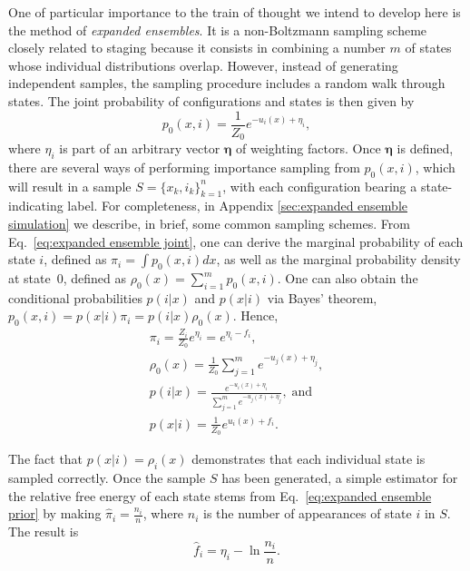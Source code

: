 \documentclass[aip,jcp,reprint,amsmath,amssymb]{revtex4-1}
\newcommand{\vt}[1]{\boldsymbol{\mathbf{#1}}}           %
\begin{document}
One of particular importance to the train of thought we intend to develop here is the method of \textit{expanded ensembles}.\cite{Lyubartsev_1992} It is a non-Boltzmann sampling scheme closely related to staging because it consists in combining a number $m$ of states whose individual distributions overlap. However, instead of generating independent samples, the sampling procedure includes a random walk through states. The joint probability of configurations and states is then given by\cite{Nymeyer_2010}
\begin{equation}
\label{eq:expanded ensemble joint}
p_0(x, i) = \frac{1}{Z_0} e^{-u_i(x) + \eta_i},
\end{equation}
where $\eta_i$ is part of an arbitrary vector $\vt \eta$ of weighting factors. Once $\vt \eta$ is defined, there are several ways of performing importance sampling from $p_0(x,i)$, which will result in a sample $S = \{x_k,i_k\}_{k=1}^n$, with each configuration bearing a state-indicating label. For completeness, in Appendix \ref{sec:expanded ensemble simulation} we describe, in brief, some common sampling schemes. From Eq.~\eqref{eq:expanded ensemble joint}, one can derive the marginal probability of each state $i$, defined as $\pi_i = \int p_0(x,i)dx$, as well as the marginal probability density at state~$0$, defined as $\rho_0(x) = \sum_{i=1}^m p_0(x,i)$. One can also obtain the conditional probabilities $p(i|x)$ and $p(x|i)$ via Bayes' theorem, $p_0(x,i) = p(x|i) \pi_i = p(i|x) \rho_0(x)$. Hence,
\begin{subequations}
\label{eq:expanded ensemble probabilities}
\begin{gather}
\pi_i = \frac{Z_i}{Z_0} e^{\eta_i} = e^{\eta_i - f_i}, \label{eq:expanded ensemble prior} \\
\rho_0(x) = \frac{1}{Z_0} \sum_{j=1}^m e^{-u_j(x) + \eta_j}, \label{eq:expanded ensemble evidence} \\
p(i|x) = \frac{e^{-u_i(x) + \eta_i}}{\sum_{j=1}^m e^{-u_j(x) + \eta_j}}, \; \text{and} \label{eq:expanded ensemble posterior} \\
p(x|i) = \frac{1}{Z_0} e^{u_i(x) + f_i}. \label{eq:expanded ensemble likelihood}
\end{gather}
\end{subequations}

The fact that $p(x|i) = \rho_i(x)$ demonstrates that each individual state is sampled correctly. Once the sample $S$ has been generated, a simple estimator for the relative free energy of each state stems from Eq.~\eqref{eq:expanded ensemble prior} by making $\hat \pi_i = \frac{n_i}{n}$, where $n_i$ is the number of appearances of state $i$ in $S$. The result is
\begin{equation}
\label{eq:expanded ensemble histogram estimator}
\hat f_i = \eta_i - \ln \frac{n_i}{n}.
\end{equation}
\end{document}
